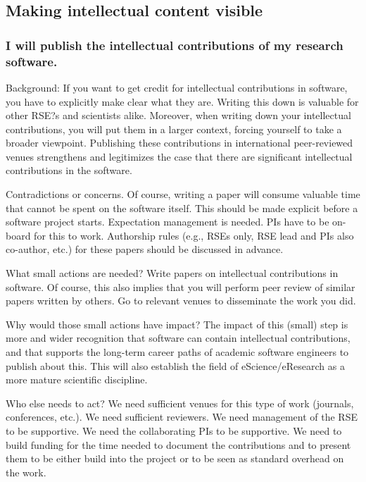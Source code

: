 \documentclass[a4paper,UKenglish]{dagman}
\renewcommand{\paragraph}[1]{\subsubsection*{#1}\xspace}
\begin{document}
\subsection{Making intellectual content visible}

\paragraph{I will publish the intellectual contributions of my research software.}



Background: 
If you want to get credit for intellectual contributions in software, you have to explicitly make clear what they are. Writing this down is valuable for other RSE?s and scientists alike. Moreover, when writing down your intellectual contributions, you will put them in a larger context, forcing yourself to take a broader viewpoint. Publishing these contributions in international peer-reviewed venues strengthens and legitimizes the case that there are significant intellectual contributions in the software.

Contradictions or concerns.
Of course, writing a paper will consume valuable time that cannot be spent on the software itself. This should be made explicit before a software project starts. Expectation management is needed. PIs have to be on-board for this to work. Authorship rules (e.g., RSEs only, RSE lead and PIs also co-author, etc.) for these papers should be discussed in advance.

What small actions are needed?
Write papers on intellectual contributions in software. Of course, this also implies that you will perform peer review of similar papers written by others. Go to relevant venues to disseminate the work you did.

Why would those small actions have impact?
The impact of this (small) step is more and wider recognition that software can contain intellectual contributions, and that supports the long-term career paths of academic software engineers to publish about this. This will also establish the field of eScience/eResearch as a more mature scientific discipline.

Who else needs to act?
We need sufficient venues for this type of work (journals, conferences, etc.).  We need sufficient reviewers.  We need management of the RSE to be supportive.  We need the collaborating PIs to be supportive.  We need to build funding for the time needed to document the contributions and to present them to be either build into the project or to be seen as standard overhead on the work.
\end{document}
